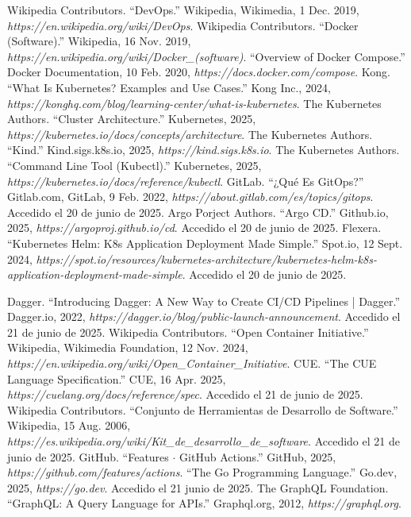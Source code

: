 \begin{thebibliography}{99}
 Wikipedia Contributors. ``DevOps.'' Wikipedia, Wikimedia, 1 Dec. 2019, {\it https://en.wikipedia.org/wiki/DevOps}.
 Wikipedia Contributors. ``Docker (Software).'' Wikipedia, 16 Nov. 2019, {\it https://en.wikipedia.org/wiki/Docker\_(software)}.
 ``Overview of Docker Compose.'' Docker Documentation, 10 Feb. 2020, {\it https://docs.docker.com/compose}.
 Kong. ``What Is Kubernetes? Examples and Use Cases.'' Kong Inc., 2024, {\it https://konghq.com/blog/learning-center/what-is-kubernetes}.
 The Kubernetes Authors. ``Cluster Architecture.'' Kubernetes, 2025, {\it https://kubernetes.io/docs/concepts/architecture}.
 The Kubernetes Authors. ``Kind.'' Kind.sigs.k8s.io, 2025, {\it https://kind.sigs.k8s.io}.
 The Kubernetes Authors. ``Command Line Tool (Kubectl).'' Kubernetes, 2025, {\it https://kubernetes.io/docs/reference/kubectl}.
 GitLab. ``¿Qué Es GitOps?'' Gitlab.com, GitLab, 9 Feb. 2022, {\it https://about.gitlab.com/es/topics/gitops}. Accedido el 20 de junio de 2025.
 Argo Porject Authors. ``Argo CD.'' Github.io, 2025, {\it https://argoproj.github.io/cd}. Accedido el 20 de junio de 2025.
 Flexera. ``Kubernetes Helm: K8s Application Deployment Made Simple.'' Spot.io, 12 Sept. 2024, {\it https://spot.io/resources/kubernetes-architecture/kubernetes-helm-k8s-application-deployment-made-simple}. Accedido el 20 de junio de 2025.

 Dagger. ``Introducing Dagger: A New Way to Create CI/CD Pipelines | Dagger.'' Dagger.io, 2022, {\it https://dagger.io/blog/public-launch-announcement}. Accedido el 21 de junio de 2025.
 Wikipedia Contributors. ``Open Container Initiative.'' Wikipedia, Wikimedia Foundation, 12 Nov. 2024, {\it https://en.wikipedia.org/wiki/Open\_Container\_Initiative}.
 CUE. ``The CUE Language Specification.'' CUE, 16 Apr. 2025, {\it https://cuelang.org/docs/reference/spec}. Accedido el 21 de junio de 2025.
 Wikipedia Contributors. ``Conjunto de Herramientas de Desarrollo de Software.'' Wikipedia, 15 Aug. 2006, {\it https://es.wikipedia.org/wiki/Kit\_de\_desarrollo\_de\_software}. Accedido el 21 de junio de 2025.
 GitHub. ``Features $\cdot$ GitHub Actions.'' GitHub, 2025, {\it https://github.com/features/actions}.
 ``The Go Programming Language.'' Go.dev, 2025, {\it https://go.dev}. Accedido el 21 junio de 2025.
 The GraphQL Foundation. ``GraphQL: A Query Language for APIs.'' Graphql.org, 2012, {\it https://graphql.org}.


\end{thebibliography}
